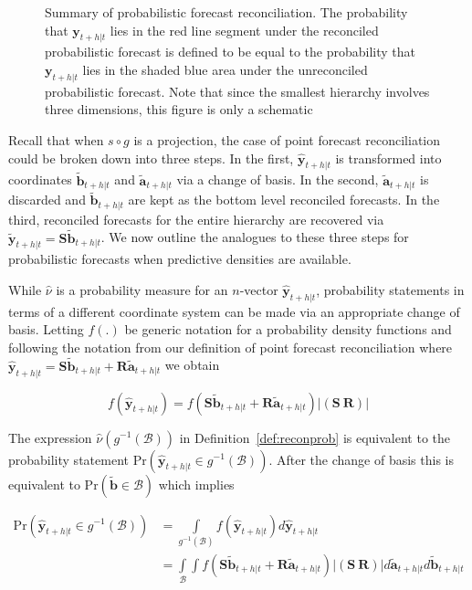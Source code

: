 \documentclass[a4paper, 11pt]{article}
\theoremstyle{theo}
\theoremstyle{definition}
\begin{document}
\begin{figure}
	
	\caption{Summary of probabilistic forecast reconciliation.  The probability that ${\bm y}_{t+h|t}$ lies in the red line segment under the reconciled probabilistic forecast is defined to be equal to the probability that ${\bm y}_{t+h|t}$ lies in the shaded blue area under the unreconciled probabilistic forecast.  Note that since the smallest hierarchy involves three dimensions, this figure is only a schematic}\label{fig:probfr_sch} 
\end{figure}

Recall that when $s\circ g$ is a projection, the case of point forecast reconciliation could be broken down into three steps.  In the first, $\hat{\bm{y}}_{t+h|t}$ is transformed into coordinates $\tilde{\bm{b}}_{t+h|t}$ and $\tilde{\bm{a}}_{t+h|t}$ via a change of basis.  In the second, $\tilde{\bm{a}}_{t+h|t}$ is discarded and $\tilde{\bm{b}}_{t+h|t}$ are kept as the bottom level reconciled forecasts.  In the third, reconciled forecasts for the entire hierarchy are recovered via $\tilde{\bm{y}}_{t+h|t}=\bm{S}\tilde{\bm{b}}_{t+h|t}$.  We now outline the analogues to these three steps for probabilistic forecasts when predictive densities are available.

While $\hat{\nu}$ is a probability measure for an $n$-vector $\hat{\bm{y}}_{t+h|t}$,  probability statements in terms of a different coordinate system can be made via an appropriate change of basis. Letting $f(.)$ be generic notation for a probability density functions and following the notation from our definition of point forecast reconciliation where $\hat{\bm{y}}_{t+h|t}=\bm{S}\tilde{\bm{b}}_{t+h|t}+\bm{R}\tilde{\bm{a}}_{t+h|t}$ we obtain

\begin{equation}
f(\hat{\bm{y}}_{t+h|t})=f(\bm{S}\tilde{\bm{b}}_{t+h|t}+\bm{R}\tilde{\bm{a}}_{t+h|t})|\left(\bm{S}~\bm{R}\right)|
\end{equation}

The expression $\hat{\nu}(g^{-1}(\mathcal{B}))$ in Definition~\ref{def:reconprob} is equivalent to the probability statement $\mbox{Pr}(\hat{\bm{y}}_{t+h|t}\in g^{-1}(\mathcal{B}))$.  After the change of basis this is equivalent to $\mbox{Pr}(\tilde{\bm{b}}\in \mathcal{B})$ which implies

\begin{align}
\mbox{Pr}(\hat{\bm{y}}_{t+h|t}\in g^{-1}(\mathcal{B}))&=\int\limits_{g^{-1}(\mathcal{B})}f(\hat{\bm{y}}_{t+h|t})d\hat{\bm{y}}_{t+h|t}\\
&=\int\limits_{\mathcal{B}}\int f(\bm{S}\tilde{\bm{b}}_{t+h|t}+\bm{R}\tilde{\bm{a}}_{t+h|t})|\left(\bm{S}~\bm{R}\right)|d\tilde{\bm{a}}_{t+h|t}d\tilde{\bm{b}}_{t+h|t}
\end{align}
\end{document}
